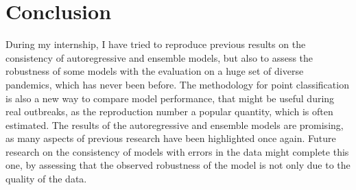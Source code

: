 \section*{Conclusion}


During my internship, I have tried to reproduce previous results on the consistency of autoregressive and ensemble models, but also to assess the robustness of some models with the evaluation on a huge set of diverse pandemics, which has never been before. 
The methodology for point classification is also a new way to compare model performance, that might be useful during real outbreaks, as the reproduction number a popular quantity, which is often estimated. 
The results of the autoregressive and ensemble models are promising, as many aspects of previous research have been highlighted once again.
Future research on the consistency of models with errors in the data might complete this one, by assessing that the observed robustness of the model is not only due to the quality of the data.

